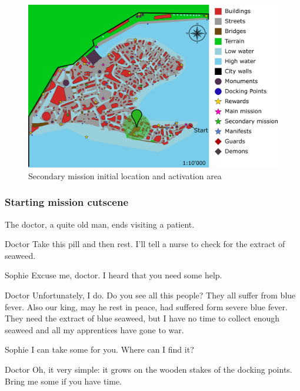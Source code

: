 \begin{figure}[H]
  \centering
  \includegraphics[width=\textwidth]{../Images/Maps/dynamiaSecondaryMissions_Doctor}
  \caption{Secondary mission initial location and activation area}
\end{figure}

\subsubsection*{Starting mission cutscene}
\begin{screenplay}

The doctor, a quite old man, ends visiting a patient.

\begin{dialogue}{Doctor}
Take this pill and then rest. I'll tell a nurse to check for the extract of seaweed.
\end{dialogue}

\begin{dialogue}{Sophie}
Excuse me, doctor. I heard that you need some help.
\end{dialogue}

\begin{dialogue}{Doctor}
Unfortunately, I do. Do you see all this people? They all suffer from blue fever. Also our king, may he rest in peace, had suffered form severe blue fever. They need the extract of blue seaweed, but I have no time to collect enough seaweed and all my apprentices have gone to war.
\end{dialogue}

\begin{dialogue}{Sophie}
I can take some for you. Where can I find it?
\end{dialogue}

\begin{dialogue}{Doctor}
Oh, it very simple: it grows on the wooden stakes of the docking points. Bring me some if you have time.
\end{dialogue}

\end{screenplay}

